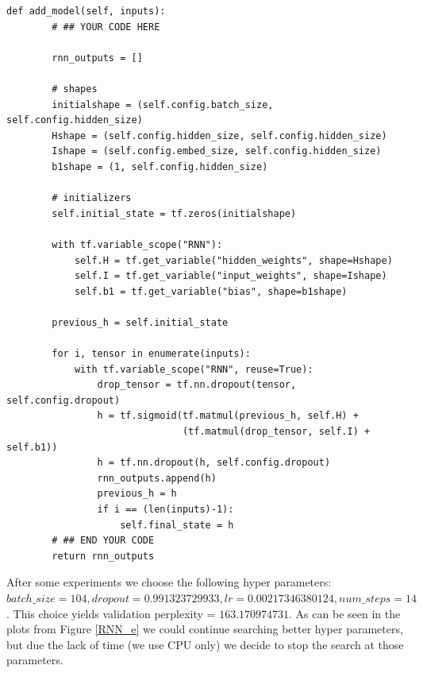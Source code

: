 \documentclass{article}
\begin{document}
\begin{verbatim}
def add_model(self, inputs):
        # ## YOUR CODE HERE

        rnn_outputs = []

        # shapes
        initialshape = (self.config.batch_size, self.config.hidden_size)
        Hshape = (self.config.hidden_size, self.config.hidden_size)
        Ishape = (self.config.embed_size, self.config.hidden_size)
        b1shape = (1, self.config.hidden_size)

        # initializers
        self.initial_state = tf.zeros(initialshape)

        with tf.variable_scope("RNN"):
            self.H = tf.get_variable("hidden_weights", shape=Hshape)
            self.I = tf.get_variable("input_weights", shape=Ishape)
            self.b1 = tf.get_variable("bias", shape=b1shape)

        previous_h = self.initial_state

        for i, tensor in enumerate(inputs):
            with tf.variable_scope("RNN", reuse=True):
                drop_tensor = tf.nn.dropout(tensor, self.config.dropout)
                h = tf.sigmoid(tf.matmul(previous_h, self.H) +
                               (tf.matmul(drop_tensor, self.I) + self.b1))
                h = tf.nn.dropout(h, self.config.dropout)
                rnn_outputs.append(h)
                previous_h = h
                if i == (len(inputs)-1):
                    self.final_state = h
        # ## END YOUR CODE
        return rnn_outputs
\end{verbatim}

After some experiments we choose the following hyper parameters: $ batch\_size=104, dropout=0.991323729933, lr=0.00217346380124, num\_steps=14$. This choice yields validation perplexity = $163.170974731$. As can be seen in the plots from Figure \ref{RNN_e} we could continue searching better hyper parameters, but due the lack of time (we use CPU only) we decide to stop the search at those parameters.
\end{document}
